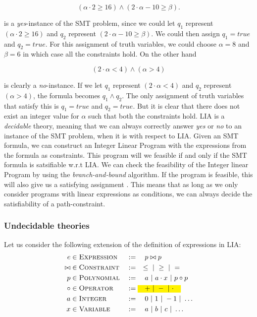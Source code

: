 	\begin{equation*}	
	(\alpha \cdot 2 \geq 16) \land (2\cdot \alpha - 10 \geq \beta).
	\end{equation*}

	is a \emph{yes}-instance of the SMT problem, since we could let $q_1$ represent $(\alpha \cdot 2 \geq 16)$ and $q_2$ represent $(2\cdot \alpha - 10 \geq \beta)$. We could then assign $q_1 = true$ and $q_2 = true$. For this assignment of truth variables, we could choose $\alpha = 8$ and $\beta = 6$ in which case all the constraints hold. On the other hand 
	
	\begin{equation*}
		(2\cdot \alpha < 4) \land (\alpha > 4)
	\end{equation*}
	
	is clearly a \emph{no}-instance. If we let $q_1$ represent $(2\cdot \alpha < 4)$ and $q_2$ represent $(\alpha > 4)$, the formula becomes $q_1\land q_2$. The only assignment of truth variables that satisfy this is $q_1 = true$ and $q_2 = true$. But it is clear that there does not exist an integer value for $\alpha$ such that both the constraints hold. LIA is a \emph{decidable} theory, meaning that we can always correctly answer \emph{yes} or \emph{no} to an instance of the SMT problem, when it is with respect to LIA. Given an SMT formula, we can construct an Integer Linear Program with the expressions from the formula as constraints. This program will we feasible if and only if the SMT formula is satsifiable w.r.t LIA. We can check the feasibility of the Integer linear Program by using the \emph{branch-and-bound} algorithm. If the program is feasible, this will also give us a satisfying assignment \citep{Vanderbei01linearprogramming:}. This means that as long as we only consider programs with linear expressions as conditions, we can always decide the satisfiability of a path-constraint.
	
	\subsubsection{Undecidable theories}
	Let us consider the following extension of the definition of expressions in LIA:
	\begin{alignat*}{3}
		e & \in \textsc{Expression} && := \quad p \bowtie p\\
		\bowtie & \in \textsc{Constraint} && := \quad \leq \alt \geq \alt =\\
		p & \in \textsc{Polynomial} && := \quad a \alt a\cdot x \alt p \circ p\\
		\circ & \in \textsc{Operator} && := \text{\hl{$\quad + \alt - \alt \cdot \quad$}} \\
		a & \in \textsc{Integer} && := \quad 0 \alt 1 \alt -1 \alt \ldots\\ 
		x & \in \textsc{Variable} && := \quad a \alt b \alt c \alt \ldots
	\end{alignat*}
	
